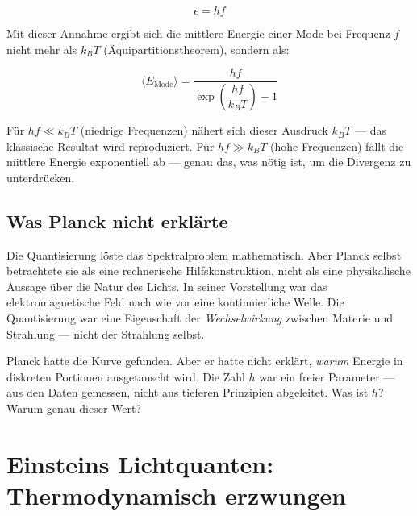 \begin{equation}
    \epsilon = hf
    \label{eq:planck_quantum}
\end{equation}

Mit dieser Annahme ergibt sich die mittlere Energie einer Mode bei Frequenz $f$ nicht 
mehr als $k_BT$ (Äquipartitionstheorem), sondern als:

\begin{equation}
    \langle E_{\text{Mode}} \rangle = \frac{hf}{\exp\!\left(\dfrac{hf}{k_BT}\right) - 1}
    \label{eq:planck_mean_energy}
\end{equation}

Für $hf \ll k_BT$ (niedrige Frequenzen) nähert sich dieser Ausdruck $k_BT$ — das 
klassische Resultat wird reproduziert. Für $hf \gg k_BT$ (hohe Frequenzen) fällt die 
mittlere Energie exponentiell ab — genau das, was nötig ist, um die Divergenz zu 
unterdrücken.

\subsection{Was Planck nicht erklärte}

Die Quantisierung löste das Spektralproblem mathematisch. Aber Planck selbst betrachtete 
sie als eine rechnerische Hilfskonstruktion, nicht als eine physikalische Aussage über 
die Natur des Lichts. In seiner Vorstellung war das elektromagnetische Feld nach wie 
vor eine kontinuierliche Welle. Die Quantisierung war eine Eigenschaft der 
\emph{Wechselwirkung} zwischen Materie und Strahlung — nicht der Strahlung selbst.

\begin{keyresult}
    Planck hatte die Kurve gefunden. Aber er hatte nicht erklärt, \emph{warum} Energie 
    in diskreten Portionen ausgetauscht wird. Die Zahl $h$ war ein freier Parameter — 
    aus den Daten gemessen, nicht aus tieferen Prinzipien abgeleitet. 
    Was ist $h$? Warum genau dieser Wert?
\end{keyresult}

\clearpage

\section{Einsteins Lichtquanten: Thermodynamisch erzwungen}
\label{sec:einstein}

